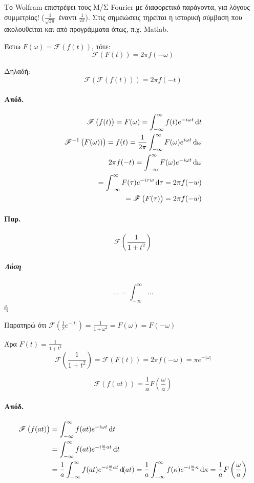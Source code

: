 \documentclass[11pt,a4paper,titlepage,final]{article}
\begin{document}
\begin{attnbox}{}
Το \textlatin{Wolfram} επιστρέφει τους Μ/Σ \textlatin{Fourier} με διαφορετικό παράγοντα, για λόγους συμμετρίας! (\(\frac{1}{\sqrt{2\pi}}\) έναντι \(\frac{1}{2\pi}\)). Στις σημειώσεις τηρείται η ιστορική σύμβαση που ακολουθείται και από προγράμματα όπως, π.χ. \textlatin{Matlab}.
\end{attnbox}

\begin{theorem}{}{}
Έστω \(F( \omega )= \mathscr{F} \left( f(t) \right)\), τότε:
\[
 \mathscr{F} \left( F(t) \right) = 2\pi f(-\omega)
\]

Δηλαδή:
\[
 \mathscr{F} \left(  \mathscr{F} \left( f(t) \right) \right) = 2\pi f(-t)
\]
\end{theorem}
\paragraph{Απόδ.}
\begin{align*}
 \mathscr{F} \left( f(t) \right) = F(\omega) = \int_{-\infty}^\infty f(t)e^{-i\omega t} \dif t \\
 \mathscr{F}^{-1} \left( F(\omega)) \right) = f(t) = \frac{1}{2\pi}\int_{-\infty}^\infty F(\omega)e^{i\omega t} \dif \omega \\
 2\pi f(-t) = \int_{-\infty}^ \infty F(\omega) e^{-i\omega t} \dif \omega
 \\
= \int_{-\infty}^ \infty F(\tau)e^{-i\tau w} \dif \tau = 2\pi f(-w) \\
=  \mathscr{F} \left( F(\tau) \right) =2\pi f(-w)
\end{align*}

\paragraph{Παρ.}
\[
 \mathscr{F} \left(
 \frac{1}{1+t^2}
 \right)
\]
\subparagraph{Λύση}
\[
\dots = \int_{-\infty}^\infty \dots
\]
ή

Παρατηρώ ότι \( \mathscr{F} (\frac{1}{2}e^{-|t|}) = \frac{1}{1+\omega^2} = F(\omega) = F(-\omega)\)

Άρα \(F(t) = \frac{1}{1+t^2}\)
\[
 \mathscr{F}  \left(
 \frac{1}{1+t^2}
 \right) =  \mathscr{F} \left( F(t) \right) = 2\pi f(-\omega) = \pi e^{-|\omega|}
\]

\begin{theorem}{}{}
\[
 \mathscr{F} \left( f(at) \right) = \frac{1}{a} F \left(\frac{\omega}{a} \right)
\]
\end{theorem}
\paragraph{Απόδ.}
\begin{align*}
 \mathscr{F} \left( f(at) \right)&=\int_{-\infty}^\infty f(at) e^{-i  \omega t} \dif t
 \\ &=
 \int_{-\infty}^\infty f(at)e^{-i\frac{\omega}{a}at} \dif t
 \\ &=
\frac{1}{a}  \int_{-\infty}^\infty f(at)e^{-i\frac{\omega}{a}at} \dif (at)
=
\frac{1}{a} \int_{-\infty}^\infty f(\kappa) e^{-i\frac{\omega}{a}\kappa} \dif \kappa
= \frac{1}{a}	F\left( \frac{\omega}{a}\right)
\end{align*}
\end{document}

